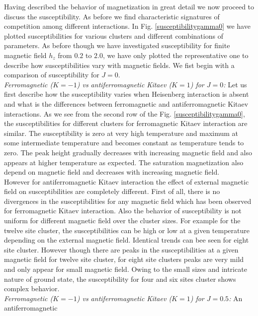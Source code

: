\documentclass[aps,amsmath,twocolumn,amssymb,floatfix,showpacs,superscriptaddress,nofootinbib,longbibliography]{revtex4-1}
\begin{document}
Having described the behavior of magnetization in great detail we now proceed to discuss the susceptibility. As before we find characteristic signatures of competition among different interactions. In Fig. \ref{susceptibilitygamma0} we have plotted susceptibilities for various clusters and different combinations of parameters. As before though we have investigated susceptibility for finite magnetic field $h_z$ from $0.2$ to $2.0$, we have only plotted the representative one to describe how susceptibilities vary with magnetic fields. We fist begin with a comparison of susceptibility for $J=0$. \\
\indent
{\it \small{Ferromagnetic ($K=-1$) vs antiferromagnetic Kitaev ($K=1$) for $J=0$:}}
Let us first describe how the susceptibility varies when Heisenberg interaction is absent and what is the differences between ferromagnetic and antiferromagnetic Kitaev interactions. As we see from the second row
of the Fig. \ref{susceptibilitygamma0}, the susceptibilities for different clusters for ferromagnetic Kitaev
interaction are similar.  The susceptibility is zero at very high temperature and maximum at some intermediate 
temperature and becomes constant as temperature tends to zero. The peak height gradually decreases with
increasing magnetic field and also appears at higher temperature as expected. The saturation magnetization also depend on magnetic field and decreases with increasing magnetic field.\\
\indent
 However for antiferromagnetic Kitaev interaction the effect of external magnetic field on susceptibilities are completely different. First of all, there is no divergences in the susceptibilities  for any magnetic field which has been observed for ferromagnetic Kitaev interaction. Also the behavior of susceptibility is not uniform
for different magnetic field over the cluster sizes. For example for the twelve site cluster, the susceptibilities can be high or low at a given temperature depending on the external magnetic field. Identical trends can bee seen for eight site cluster. However though there are peaks in the susceptibilities at a given magnetic field for twelve site cluster, for eight site clusters peaks are very mild and only appear for small magnetic field. Owing to the small sizes and intricate nature of ground state, the susceptibility for four and six sites  cluster shows complex behavior.\\
\indent
{\it \small{Ferromagnetic ($K=-1$) vs antiferromagnetic Kitaev ($K=1$) for $J=0.5$:}} An antiferromagnetic
\end{document}

